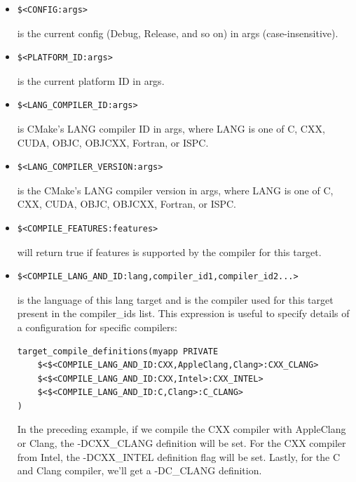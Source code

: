 \begin{itemize}
\item 
\begin{lstlisting}[style=styleCMake]
$<CONFIG:args>
\end{lstlisting}
is the current config (Debug, Release, and so on) in args (case-insensitive).

\item 
\begin{lstlisting}[style=styleCMake]
$<PLATFORM_ID:args>
\end{lstlisting}
is the current platform ID in args.

\item 
\begin{lstlisting}[style=styleCMake]
$<LANG_COMPILER_ID:args>
\end{lstlisting}
is CMake's LANG compiler ID in args, where LANG is one of C, CXX, CUDA, OBJC, OBJCXX, Fortran, or ISPC.

\item 
\begin{lstlisting}[style=styleCMake]
$<LANG_COMPILER_VERSION:args>
\end{lstlisting}
is the CMake's LANG compiler version in args, where LANG is one of C, CXX, CUDA, OBJC, OBJCXX, Fortran, or ISPC.

\item 
\begin{lstlisting}[style=styleCMake]
$<COMPILE_FEATURES:features>
\end{lstlisting}
will return true if features is supported by the compiler for this target.

\item 
\begin{lstlisting}[style=styleCMake]
$<COMPILE_LANG_AND_ID:lang,compiler_id1,compiler_id2...>
\end{lstlisting}
is the language of this lang target and is the compiler used for this target present in the compiler\_ids list. This expression is useful to specify details of a configuration for specific compilers:

\begin{lstlisting}[style=styleCMake]
target_compile_definitions(myapp PRIVATE
	$<$<COMPILE_LANG_AND_ID:CXX,AppleClang,Clang>:CXX_CLANG>
	$<$<COMPILE_LANG_AND_ID:CXX,Intel>:CXX_INTEL>
	$<$<COMPILE_LANG_AND_ID:C,Clang>:C_CLANG>
)
\end{lstlisting}

In the preceding example, if we compile the CXX compiler with AppleClang or Clang, the -DCXX\_CLANG definition will be set. For the CXX compiler from Intel, the -DCXX\_INTEL definition flag will be set. Lastly, for the C and Clang compiler, we'll get a -DC\_CLANG definition.


\end{itemize}
